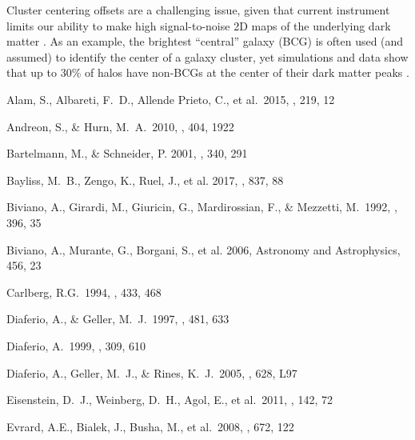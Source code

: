 \documentclass[apj]{emulateapj}
\begin{document}
Cluster centering offsets are a challenging issue, given that current instrument limits our ability to make high signal-to-noise 2D maps of the underlying dark matter \citep{vonderLinden2014,Umetsu14}. As an example, the brightest ``central'' galaxy (BCG) is often used (and assumed) to identify the center of a galaxy cluster, yet simulations and data show that up to 30\% of halos have non-BCGs at the center of their dark matter peaks \citep{Skibba10, Zitrin12, vanUitert16}.


\begin{figure*}
\caption{}
\label{fig:results}
\end{figure*}

\begin{thebibliography}{42}
{} Alam, S., Albareti, F.~D., Allende Prieto, C., et al.\ 2015, \apjs, 219, 12 


 Andreon, S., \& Hurn, M.~A.\ 2010, \mnras, 404, 1922 


 Bartelmann, M., \& Schneider, P. 2001, \physrep, 340, 291 

 Bayliss, M.~B., Zengo, K., Ruel, J., et al. 2017, \apj, 837, 88 

 Biviano, A., Girardi, M., Giuricin, G., Mardirossian, F., \& Mezzetti, M.\ 1992, \apj, 396, 35 

 Biviano, A., Murante, G., Borgani, S., et al. 2006, Astronomy and Astrophysics, 456, 23 

 Carlberg, R.G.\ 1994, \apj, 433, 468 

 Diaferio, A., \& Geller, M.~J.\ 1997, \apj, 481, 633 

 Diaferio, A.\ 1999, \mnras, 309, 610 

 Diaferio, A., Geller, M.~J., \& Rines, K.~J.\ 2005, \apjl, 628, L97 

 Eisenstein, D.~J., Weinberg, D.~H., Agol, E., et al.\ 2011, \aj, 142, 72 


 Evrard, A.E., Bialek, J., Busha, M., et al.\ 2008, \apj, 672, 122 


\end{thebibliography}
\end{document}
